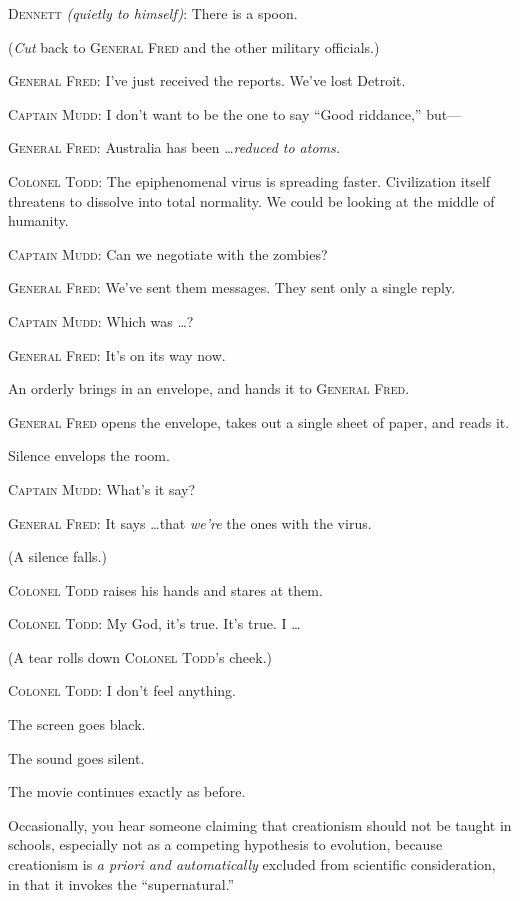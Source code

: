 {
 \textsc{Dennett} \textit{(quietly to himself)}: There is a spoon.}

{
 (\textit{Cut} back to \textsc{General Fred} and the other military
officials.)}

{
 \textsc{General Fred}: I've just received the reports.
We've lost Detroit.}

{
 \textsc{Captain Mudd}: I don't want to be the one to say
``Good riddance,'' but---}

{
 \textsc{General Fred}: Australia has been \ldots \textit{reduced to atoms.}}

{
 \textsc{Colonel Todd}: The epiphenomenal virus is spreading faster.
Civilization itself threatens to dissolve into total normality. We
could be looking at the middle of humanity.}

{
 \textsc{Captain Mudd}: Can we negotiate with the zombies?}

{
 \textsc{General Fred}: We've sent them messages. They sent
only a single reply.}

{
 \textsc{Captain Mudd}: Which was \ldots ?}

{
 \textsc{General Fred}: It's on its way now.}

{
 An orderly brings in an envelope, and hands it to \textsc{General Fred}.}

{
 \textsc{General Fred} opens the envelope, takes out a single sheet of
paper, and reads it.}

{
 Silence envelops the room.}

{
 \textsc{Captain Mudd}: What's it say?}

{
 \textsc{General Fred}: It says \ldots that \textit{we're}
the ones with the virus.}

{
 (A silence falls.)}

{
 \textsc{Colonel Todd} raises his hands and stares at them.}

{
 \textsc{Colonel Todd}: My God, it's true.
It's true. I \ldots}

{
 (A tear rolls down \textsc{Colonel Todd}'s cheek.)}

{
 \textsc{Colonel Todd}: I don't feel anything.}

{
 The screen goes black.}

{
 The sound goes silent.}

{
 The movie continues exactly as before.}

\myendsectiontext


{
 Occasionally, you hear someone claiming that creationism should
not be taught in schools, especially not as a competing hypothesis to
evolution, because creationism is \textit{a priori and automatically}
excluded from scientific consideration, in that it invokes the
``supernatural.'' }

